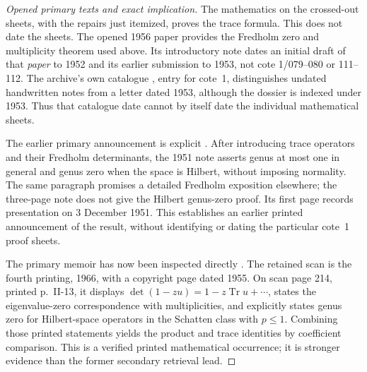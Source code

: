 \begin{proof}[Opened primary texts and exact implication]
The mathematics on the crossed-out sheets, with the repairs just itemized,
proves the trace formula. This does not date the sheets. The opened 1956
paper provides the Fredholm zero and multiplicity theorem used above. Its
introductory note dates an initial draft of that \emph{paper} to 1952 and
its earlier submission to 1953, not cote 1/079--080 or 111--112.
The archive's own catalogue \cite{geoMontpellierCatalogue}, entry for
cote~1, distinguishes undated handwritten notes from a letter dated 1953,
although the dossier is indexed under 1953. Thus that catalogue date
cannot by itself date the individual mathematical sheets.

The earlier primary announcement is explicit
\cite[p.~1557, \S1, final paragraph]{algGrothendieckCR1951Tensor}.
After introducing trace operators and their Fredholm determinants, the
1951 note asserts genus at most one in general and genus zero when the
space is Hilbert, without imposing normality. The same paragraph promises
a detailed Fredholm exposition elsewhere; the three-page note does not
give the Hilbert genus-zero proof. Its first page records presentation on
3 December 1951. This establishes an earlier printed announcement of the
result, without identifying or dating the particular cote~1 proof sheets.

The primary memoir has now been inspected directly
\cite[Chapter II, \S1, no.~4, printed p.~13]{Grothendieck1955Memoir}.
The retained scan is the fourth printing, 1966, with a copyright page dated
1955. On scan page 214, printed p.~II-13, it displays
$\det(1-zu)=1-z\operatorname{Tr}u+\cdots$, states the eigenvalue-zero
correspondence with multiplicities, and explicitly states genus zero for
Hilbert-space operators in the Schatten class with $p\leq1$. Combining
those printed statements yields the product and trace identities by
coefficient comparison. This is a verified printed mathematical occurrence;
it is stronger evidence than the former secondary retrieval lead.


\end{proof}
